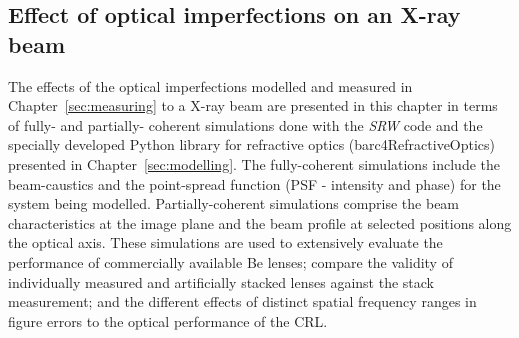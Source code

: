 \begin{refsection}
\chapter{Effect of optical imperfections on an X-ray beam}
\label{sec:effect_optical_imperfections}

The effects of the optical imperfections modelled and measured in Chapter~\ref{sec:measuring} to a X-ray beam are presented in this chapter in terms of fully- and partially- coherent simulations done with the \textit{SRW} code and the specially developed Python library for refractive optics (barc4RefractiveOptics) presented in Chapter~\ref{sec:modelling}. The fully-coherent simulations include the beam-caustics and the point-spread function (PSF - intensity and phase) for the system being modelled. Partially-coherent simulations comprise the beam characteristics at the image plane and the beam profile at selected positions along the optical axis. These simulations are used to extensively evaluate the performance of commercially available Be lenses; compare the validity of individually measured and artificially stacked lenses against the stack measurement; and the different effects of distinct spatial frequency ranges in figure errors to the optical performance of the CRL.


\end{refsection}
